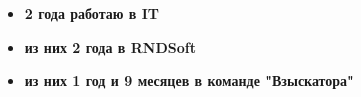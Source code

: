 \begin{frame}
  \begin{columns}
    \begin{column}{0.48\textwidth}
        \begin{itemize}[label=]
            \item \vspace{0.5em} \textbf{2 года работаю в IT}
            \item \vspace{0.5em} \textbf{из них 2 года в RNDSoft}
            \item \vspace{0.5em} \textbf{из них 1 год и 9 месяцев в команде "Взыскатора"}
        \end{itemize}
    \end{column}
    \begin{column}{0.48\textwidth}
        \begin{center}
\end{center}
\end{column}
\end{columns}
\end{frame}
